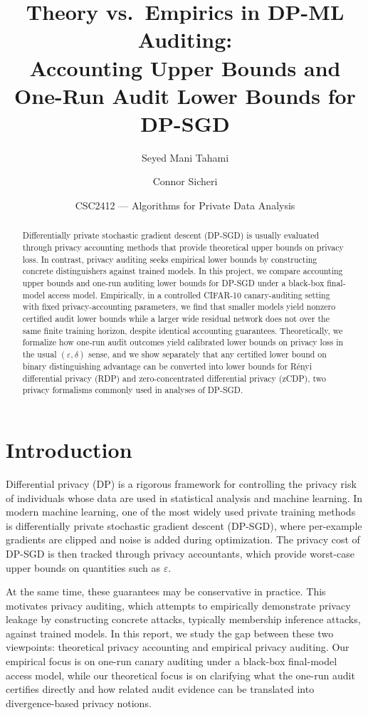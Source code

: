 \documentclass[10pt]{article}
\title{\textbf{Theory vs.\ Empirics in DP-ML Auditing:\\
Accounting Upper Bounds and One-Run Audit Lower Bounds for DP-SGD}}
\author{Seyed Mani Tahami \and Connor Sicheri}
\date{CSC2412 --- Algorithms for Private Data Analysis}
\newcommand{\eps}{\varepsilon}
\newcommand{\del}{\delta}
\begin{document}
\maketitle

\begin{abstract}
Differentially private stochastic gradient descent (DP-SGD) is usually evaluated through privacy accounting methods that provide theoretical upper bounds on privacy loss. In contrast, privacy auditing seeks empirical lower bounds by constructing concrete distinguishers against trained models. In this project, we compare accounting upper bounds and one-run auditing lower bounds for DP-SGD under a black-box final-model access model. Empirically, in a controlled CIFAR-10 canary-auditing setting with fixed privacy-accounting parameters, we find that smaller models yield nonzero certified audit lower bounds while a larger wide residual network does not over the same finite training horizon, despite identical accounting guarantees. Theoretically, we formalize how one-run audit outcomes yield calibrated lower bounds on privacy loss in the usual $(\eps,\del)$ sense, and we show separately that any certified lower bound on binary distinguishing advantage can be converted into lower bounds for R\'enyi differential privacy (RDP) and zero-concentrated differential privacy (zCDP), two privacy formalisms commonly used in analyses of DP-SGD.
\end{abstract}

\section{Introduction}

Differential privacy (DP) is a rigorous framework for controlling the privacy risk of individuals whose data are used in statistical analysis and machine learning. In modern machine learning, one of the most widely used private training methods is differentially private stochastic gradient descent (DP-SGD), where per-example gradients are clipped and noise is added during optimization. The privacy cost of DP-SGD is then tracked through privacy accountants, which provide worst-case upper bounds on quantities such as $\eps$.

At the same time, these guarantees may be conservative in practice. This motivates privacy auditing, which attempts to empirically demonstrate privacy leakage by constructing concrete attacks, typically membership inference attacks, against trained models. In this report, we study the gap between these two viewpoints: theoretical privacy accounting and empirical privacy auditing. Our empirical focus is on one-run canary auditing under a black-box final-model access model, while our theoretical focus is on clarifying what the one-run audit certifies directly and how related audit evidence can be translated into divergence-based privacy notions.
\end{document}
